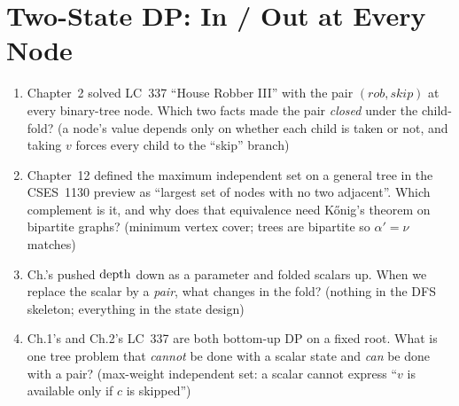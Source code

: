 \section{Two-State DP: In / Out at Every Node}\label{sec:c10-twostate}

\begin{previouslybox}
\begin{enumerate}[nosep, leftmargin=1.6em]
  \item Chapter~2 solved LC~337 ``House Robber III'' with the pair
        $(\mathit{rob},\mathit{skip})$ at every binary-tree node. Which
        two facts made the pair \emph{closed} under the child-fold?
        (a node's value depends only on whether each child is taken or
        not, and taking $v$ forces every child to the ``skip'' branch)
  \item Chapter~12 defined the maximum independent set on a general tree
        in the CSES~1130 preview as ``largest set of nodes with no two
        adjacent''. Which complement is it, and why does that equivalence
        need K{\H{o}}nig's theorem on bipartite graphs? (minimum vertex
        cover; trees are bipartite so $\alpha'=\nu$ matches)
  \item Ch.'s  pushed $\operatorname{depth}$ down as a
        parameter and folded scalars up. When we replace the scalar by a
        \emph{pair}, what changes in the fold? (nothing in the DFS
        skeleton; everything in the state design)
  \item Ch.1's  and Ch.2's LC~337 are both
        bottom-up DP on a fixed root. What is one tree problem that
        \emph{cannot} be done with a scalar state and \emph{can} be done
        with a pair? (max-weight independent set: a scalar cannot
        express ``$v$ is available only if $c$ is skipped'')
\end{enumerate}
\end{previouslybox}

